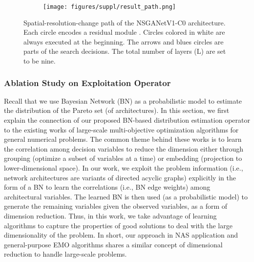 \documentclass[journal]{IEEEtran}
\def\ourmethod{NSGANetV1}
\theoremstyle{definition}
\theoremstyle{remark}
\begin{document}
\begin{figure}[!htbp]
	\centering
	\begin{subfigure}[t]{.48\textwidth}
		\centering
		\texttt{[image: figures/suppl/result\_path.png]}
	\end{subfigure}
	\caption{Spatial-resolution-change path of the \ourmethod{}-C0 architecture. Each circle encodes a residual module \cite{resnet}. Circles colored in white are always executed at the beginning. The arrows and blues circles are parts of the search decisions. The total number of layers (L) are set to be nine.
	\label{fig:nsganet_cmucars}}
\end{figure}

{
\subsubsection{Ablation Study on Exploitation Operator}
{
Recall that we use Bayesian Network (BN) as a probabilistic model to estimate the distribution of the Pareto set (of architectures). In this section, we first explain the connection of our proposed BN-based distribution estimation operator to the existing works \cite{5415586,7929324,8533425} of large-scale multi-objective optimization algorithms for general numerical problems. The common theme behind these works is to learn the correlation among decision variables to reduce the dimension either through grouping (optimize a subset of variables at a time) or embedding (projection to lower-dimensional space). In our work, we exploit the problem information (i.e., network architectures are variants of directed acyclic graphs) explicitly in the form of a BN to learn the correlations (i.e., BN edge weights) among architectural variables. The learned BN is then used (as a probabilistic model) to generate the remaining variables given the observed variables, as a form of dimension reduction. Thus, in this work, we take advantage of learning algorithms to capture the properties of good solutions to deal with the large dimensionality of the problem. In short, our approach in NAS application and general-purpose EMO algorithms shares a similar concept of dimensional reduction to handle large-scale problems.}

}
\end{document}
